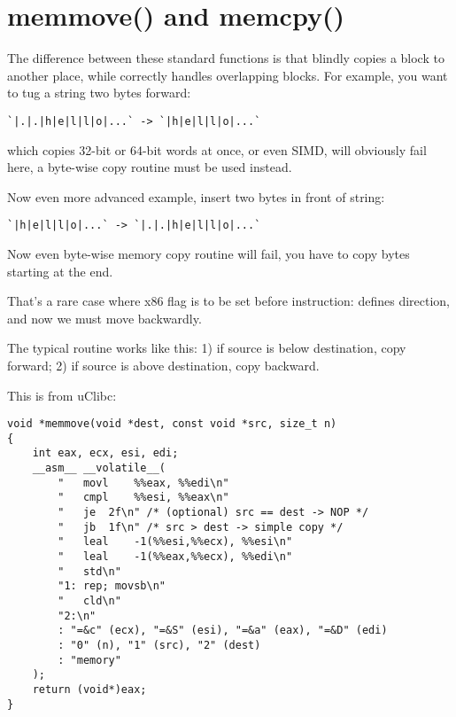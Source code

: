 \section{memmove() and memcpy()}
\label{memmove_and_DF}

The difference between these standard functions is that  blindly copies a block to another place,
while  correctly handles overlapping blocks.
For example, you want to tug a string two bytes forward:

\begin{lstlisting}
`|.|.|h|e|l|l|o|...` -> `|h|e|l|l|o|...`
\end{lstlisting}

 which copies 32-bit or 64-bit words at once, or even \ac{SIMD},
will obviously fail here, a byte-wise copy routine must be used instead.

Now even more advanced example, insert two bytes in front of string:

\begin{lstlisting}
`|h|e|l|l|o|...` -> `|.|.|h|e|l|l|o|...`
\end{lstlisting}

Now even byte-wise memory copy routine will fail, you have to copy bytes starting at the end.

That's a rare case where  x86 flag is to be set before  instruction:
 defines direction, and now we must move backwardly.

The typical  routine works like this:
1) if source is below destination, copy forward;
2) if source is above destination, copy backward.

This is  from uClibc:

\begin{lstlisting}[style=customc]
void *memmove(void *dest, const void *src, size_t n)
{
	int eax, ecx, esi, edi;
	__asm__ __volatile__(
		"	movl	%%eax, %%edi\n"
		"	cmpl	%%esi, %%eax\n"
		"	je	2f\n" /* (optional) src == dest -> NOP */
		"	jb	1f\n" /* src > dest -> simple copy */
		"	leal	-1(%%esi,%%ecx), %%esi\n"
		"	leal	-1(%%eax,%%ecx), %%edi\n"
		"	std\n"
		"1:	rep; movsb\n"
		"	cld\n"
		"2:\n"
		: "=&c" (ecx), "=&S" (esi), "=&a" (eax), "=&D" (edi)
		: "0" (n), "1" (src), "2" (dest)
		: "memory"
	);
	return (void*)eax;
}
\end{lstlisting}

